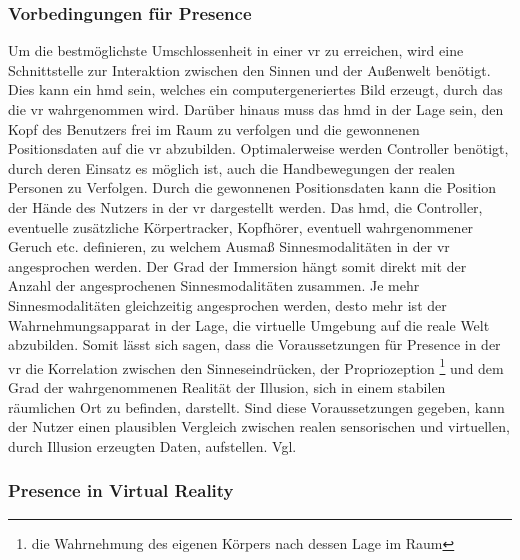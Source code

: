 \documentclass[a4paper,11pt]{article}%
\renewcommand{\\}{\vspace*{0.5\baselineskip} \newline}
\begin{document}
		\subsubsection{Vorbedingungen für Presence}
Um die bestmöglichste Umschlossenheit in einer \ac{vr} zu erreichen, wird eine Schnittstelle zur Interaktion zwischen den Sinnen und der Außenwelt benötigt. Dies kann ein \ac{hmd} sein, welches ein computergeneriertes Bild erzeugt, durch das die \ac{vr} wahrgenommen wird. Darüber hinaus muss das \ac{hmd} in der Lage sein, den Kopf des Benutzers frei im Raum zu verfolgen und die gewonnenen Positionsdaten auf die \ac{vr} abzubilden. Optimalerweise werden Controller benötigt, durch deren Einsatz es möglich ist, auch die Handbewegungen der realen Personen zu Verfolgen. Durch die gewonnenen Positionsdaten kann die Position der Hände des Nutzers in der \ac{vr} dargestellt werden. Das \ac{hmd}, die Controller, eventuelle zusätzliche Körpertracker, Kopfhörer, eventuell wahrgenommener Geruch etc. definieren, zu welchem Ausmaß Sinnesmodalitäten in der \ac{vr} angesprochen werden. Der Grad der Immersion hängt somit direkt mit der Anzahl der angesprochenen Sinnesmodalitäten zusammen. Je mehr Sinnesmodalitäten gleichzeitig angesprochen werden, desto mehr ist der Wahrnehmungsapparat in der Lage, die virtuelle Umgebung auf die reale Welt abzubilden. \\
Somit lässt sich sagen, dass die Voraussetzungen für \dq Presence\dq{} in der \ac{vr} die Korrelation zwischen den Sinneseindrücken, der Propriozeption \footnote{die Wahrnehmung des eigenen Körpers nach dessen Lage im Raum} und dem Grad der wahrgenommenen Realität der Illusion, sich in einem stabilen räumlichen Ort zu befinden, darstellt. Sind diese Voraussetzungen gegeben, kann der Nutzer einen plausiblen Vergleich zwischen realen sensorischen und virtuellen, durch Illusion erzeugten Daten, aufstellen. Vgl. \citep{slater2009we}

		\subsubsection{Presence in Virtual Reality}
			
\end{document}
